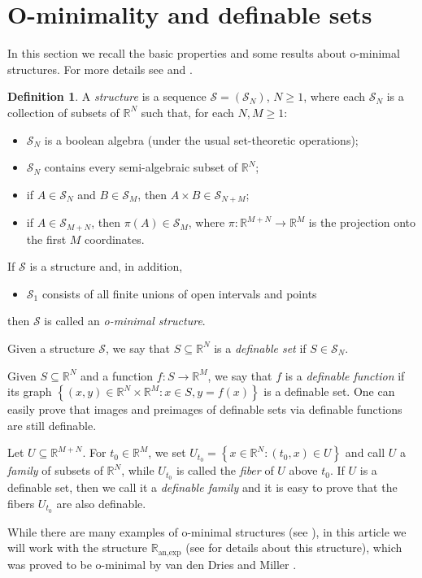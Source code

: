 \documentclass[11pt,a4paper,reqno]{amsart}
\numberwithin{equation}{section}
\newcommand{\R}{\mathbb{R}}
\newcommand{\pt}[1]{\left( #1 \right)}
\newcommand{\pg}[1]{\left\lbrace #1 \right\rbrace}
\theoremstyle{remark}
\theoremstyle{definition}
\theoremstyle{definition}
\newtheorem{definition}[theorem]{Definition}
\begin{document}
\section{O-minimality and definable sets}\label{sect:o-min_isog}
In this section we recall the basic properties and some results about o-minimal structures. For more details see \cite{vdDri98} and \cite{vdDM96}.
\begin{definition}
A \emph{structure} is a sequence $\mathcal{S}=\pt{\mathcal{S}_N}$, $N\geq 1$, where each $\mathcal{S}_N$ is a collection of subsets of $\R^N$ such that, for each $N,M\geq 1$:
\begin{itemize}
\item $\mathcal{S}_N$ is a boolean algebra (under the usual set-theoretic operations);
\item $\mathcal{S}_N$ contains every semi-algebraic subset of $\R^N$;
\item if $A \in \mathcal{S}_N$ and $B \in \mathcal{S}_M$, then $A\times B \in \mathcal{S}_{N+M}$;
\item if $A\in \mathcal{S}_{M+N}$, then $\pi(A) \in \mathcal{S}_M$, where $\pi: \R^{M+N} \rightarrow \R^M$ is the projection onto the first $M$ coordinates.
\end{itemize}
If $\mathcal{S}$ is a structure and, in addition, 
\begin{itemize}
\item $\mathcal{S}_1$ consists of all finite unions of open intervals and points
\end{itemize}
then $\mathcal{S}$ is called an \emph{o-minimal structure}.
\end{definition}
Given a structure $\mathcal{S}$, we say that $S \subseteq \R^N$ is a \emph{definable set} if $S \in \mathcal{S}_N$. 

Given $S\subseteq \R^N$ and a function $f: S\rightarrow \R^M$, we say that $f$ is a \emph{definable function} if its graph $\pg{(x,y)\in \R^N\times \R^M: x\in S, y=f(x)}$ is a definable set. One can easily prove that images and preimages of definable sets via definable functions are still definable.

Let $U\subseteq \R^{M+N}$. For $t_0\in \R^M$, we set $U_{t_0}=\pg{x\in \R^N:(t_0,x)\in U}$ and call $U$ a \emph{family} of subsets of $\R^N$, while $U_{t_0}$ is called the \emph{fiber} of $U$ above $t_0$. If $U$ is a definable set, then we call it a \emph{definable family} and it is easy to prove that the fibers $U_{t_0}$ are also definable.

While there are many examples of o-minimal structures (see \cite{vdDM96}), in this article we will work with the structure $\R_{\text{an,exp}}$ (see \cite[Chapter 8]{Pil22} for details about this structure), which was proved to be o-minimal by van den Dries and Miller \cite{vdDM94}.
\end{document}

